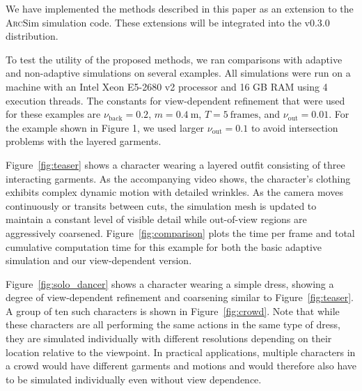 \documentclass[10pt,journal,compsoc,twoside]{TexInputs/IEEEtran}
\newcommand{\arcsim}{\textsc{Arc}Sim\xspace}
\begin{document}
\begin{table}[t]
    \caption{Statistics and timing numbers for the examples. Non-adaptive simulations use a fixed
    high-resolution mesh. 
	Adaptive simulations use the unmodified scheme implemented in ARCSim. %
	View-dependent simulations use the method described in this paper.
	The adaptive simulations are used as a baseline for comparison.  
	The non-adaptive mesh resolution was selected to match the visual quality of the 
	adaptive simulations.
}
\label{table:timings}
    \centering
    \resizebox{\textwidth}{!}{}
\end{table}


We have implemented the methods described in this paper as an extension to the
\arcsim simulation code.  
These extensions will be integrated into the v0.3.0 distribution.

To test the utility of the proposed methods, we ran comparisons with adaptive and
non-adaptive simulations on several
examples. All simulations were run on a machine with an Intel Xeon E5-2680 v2
processor and 16 GB RAM using 4 execution threads.
The constants for view-dependent refinement that were used for these examples are
$\nu_{\text{back}} = 0.2$, $m = 0.4\ \mathrm{m}$, $T = 5\ \mathrm{frames}$, and
$\nu_{\text{out}} = 0.01$.  For the example shown in Figure 1, we used larger
$\nu_{\text{out}} = 0.1$ to avoid intersection problems with the layered garments.

Figure~\ref{fig:teaser} shows a character wearing a layered outfit consisting
of three interacting garments. As the accompanying video shows, the
character's clothing exhibits complex dynamic motion with detailed wrinkles. As
the camera moves continuously or transits between cuts, the simulation mesh
is updated to maintain a constant level of visible detail while out-of-view
regions are aggressively coarsened. Figure~\ref{fig:comparison} plots the time
per frame and total cumulative computation time for this example for both the
basic adaptive simulation and our view-dependent version.

Figure~\ref{fig:solo_dancer} shows a character wearing a simple
dress, showing a degree of view-dependent refinement and coarsening similar to Figure~\ref{fig:teaser}.
A group of ten such characters is shown in
Figure~\ref{fig:crowd}. Note that while these characters are all
performing the same actions in the same type of dress, they are simulated individually
with different resolutions depending on their location relative to the viewpoint.
In practical applications, multiple characters in a crowd
would have different garments and motions and would therefore also have to be simulated
individually even without view dependence.
\end{document}
